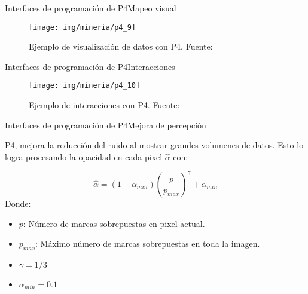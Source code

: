 \documentclass[10pt]{beamer}
\newcommand{\1}{
	\setbeamertemplate{background}{
		\texttt{[image: img/1]}
		\tikz[overlay] \fill[fill opacity=0.75,fill=white] (0,0) rectangle (-\paperwidth,\paperheight);
	}
}
\begin{document}
\begin{frame}{Interfaces de programación de P4}{Mapeo visual}
\begin{figure}[]
	\centering
	\texttt{[image: img/mineria/p4\_9]}
	\caption{Ejemplo de visualización de datos con P4. Fuente: \cite{li2018p4}}
\end{figure}
\end{frame}


\begin{frame}{Interfaces de programación de P4}{Interacciones}
\begin{figure}[]
	\centering
	\texttt{[image: img/mineria/p4\_10]}
	\caption{Ejemplo de interacciones con P4. Fuente: \cite{li2018p4}}
\end{figure}
\end{frame}



\begin{frame}{Interfaces de programación de P4}{Mejora de percepción}
\begin{block}{}
	P4, mejora la reducción del ruido al mostrar grandes volumenes de datos. Esto lo logra procesando la opacidad en cada pixel $\hat{\alpha}$ con:
	
	\[
	\hat{\alpha} = (1 - \alpha_{min})( \frac{p}{p_{max}} )^\gamma + \alpha_{min}
	\]
	Donde: \\
	\begin{itemize}
		\item $p$: Número de marcas sobrepuestas en pixel actual.
		\item $p_{max}$: Máximo número de marcas sobrepuestas en toda la imagen.
		\item $\gamma = 1/3$
		\item $\alpha_{min} = 0.1$
		
	\end{itemize}
	
\end{block}
\end{frame}
\end{document}
